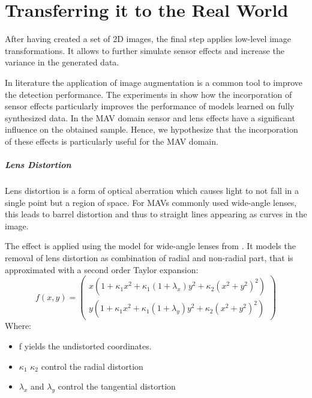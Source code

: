 \chapter{Transferring it to the Real World}
\label{sec:tradeoff}


After having created a set of 2D images, the final step applies low-level image transformations. It allows to further simulate sensor effects and increase the variance in the generated data.

In literature \cite{Krizhevsky2012a,Howard2013,Redmon,Liu} the application of image augmentation is a common tool to improve the detection performance. The experiments in \cite{Carlson2018} show how the incorporation of sensor effects particularly improves the performance of models learned on fully synthesized data. In the \ac{MAV} domain sensor and lens effects have a significant influence on the obtained sample. Hence, we hypothesize that the incorporation of these effects is particularly useful for the \ac{MAV} domain.

\paragraph{Lens Distortion}

Lens distortion is a form of optical aberration which causes light to not fall in a single point but a region of space. For \acp{MAV} commonly used wide-angle lenses, this leads to barrel distortion and thus to straight lines appearing as curves in the image.

The effect is applied using the model for wide-angle lenses from \cite{Vass}. It models the removal of lens distortion as combination of radial and non-radial part, that is approximated with a second order Taylor expansion:
\begin{equation}
f(x,y) =
\begin{pmatrix}
x (1 + \kappa_1 x^2 + \kappa_1 (1 + \lambda_x) y^2 + \kappa_2(x^2 + y^2)^2) \\
y (1 + \kappa_1 x^2 + \kappa_1 (1 + \lambda_y) y^2 + \kappa_2(x^2 + y^2)^2)
\end{pmatrix} 
\label{eq:distortion}
\end{equation}
Where:
\begin{itemize}
	\item f yields the undistorted coordinates.
	\item $\kappa_1$ $\kappa_2$ control the radial distortion 
	\item $\lambda_x$ and $\lambda_y$ control the tangential distortion
\end{itemize}

